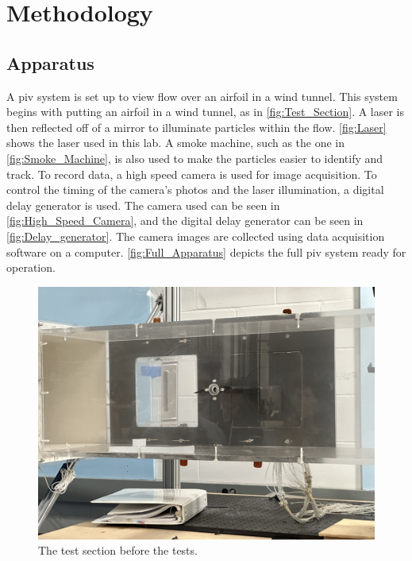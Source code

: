 \chapter{Methodology}
\label{cp:methodology}
\section{Apparatus} \label{sec:Apparatus}
A \acrfull{piv} system is set up to view flow over an airfoil in a wind tunnel. This system begins with putting an airfoil in a wind tunnel, as in \autoref{fig:Test_Section}. A laser is then reflected off of a mirror to illuminate particles within the flow. \autoref{fig:Laser} shows the laser used in this lab. A smoke machine, such as the one in \autoref{fig:Smoke_Machine}, is also used to make the particles easier to identify and track. To record data, a high speed camera is used for image acquisition. To control the timing of the camera's photos and the laser illumination, a digital delay generator is used. The camera used can be seen in \autoref{fig:High_Speed_Camera}, and the digital delay generator can be seen in \autoref{fig:Delay_generator}. The camera images are collected using data acquisition software on a computer. \autoref{fig:Full_Apparatus} depicts the full \acrshort{piv} system ready for operation. 

\begin{figure}[htpb]
    \centering
    \includegraphics[width=0.75\linewidth]{Figures/IMG_0127.jpeg}
    \caption{The test section before the tests.}
    \label{fig:Test_Section}
\end{figure}

